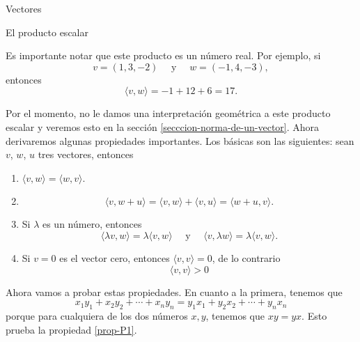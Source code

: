 \documentclass[a4paper,12pt,twoside,spanish,reqno]{amsbook}
\theoremstyle{definition}
\theoremstyle{remark}
\begin{document}
\begin{chapter}{Vectores}
\begin{section}{El producto escalar}
        
        
        Es importante notar  que este producto es un número real. Por ejemplo, si
        \begin{equation*}
            v= (1, 3, - 2) \quad\text{ y } \quad w= (- 1, 4, - 3),
        \end{equation*}
        entonces
        \begin{equation*}
            \langle v , w \rangle= - 1 + 12 + 6 = 17.
        \end{equation*}
        
        Por el momento, no le damos una interpretación geométrica a este producto escalar y veremos esto en la sección \ref{secccion-norma-de-un-vector}. Ahora derivaremos algunas propiedades importantes. Los básicas son las siguientes: sean $v$, $w$, $u$  tres vectores, entonces
        
        
        \begin{enumerate}[label=\textbf{P\arabic*.},ref=P\arabic*]
            \item\label{prop-P1}	$\langle v , w \rangle = \langle w , v \rangle$.
            \item\label{prop-P2} 
            \begin{equation*}
                \langle v , w + u \rangle =\langle v , w \rangle + \langle v , u \rangle = \langle w +u , v \rangle.
            \end{equation*}
            \item\label{prop-P3} Si $\lambda$ es un número, entonces 
            \begin{equation*}
                \langle \lambda v , w \rangle = \lambda \langle v , w \rangle \quad \text{ y } \quad  \langle v , \lambda w \rangle = \lambda \langle v , w \rangle.
            \end{equation*}
            \item\label{prop-P4} Si $v=0$ es el vector cero, entonces $\langle v , v \rangle =0$,  de lo contrario
            \begin{equation*}
                \langle v , v \rangle >0
            \end{equation*}
        \end{enumerate}
        
        Ahora vamos a probar estas propiedades. En cuanto a la primera, tenemos que
        \begin{equation*}
            x_1y_1 + x_2y_2+\cdots+x_ny_n = y_1x_1 + y_2x_2+\cdots+y_nx_n
        \end{equation*}
        porque para cualquiera de los dos números $x, y$, tenemos que $xy=yx$. Esto prueba la propiedad \ref{prop-P1}. 
        

\end{section}
\end{chapter}
\end{document}
